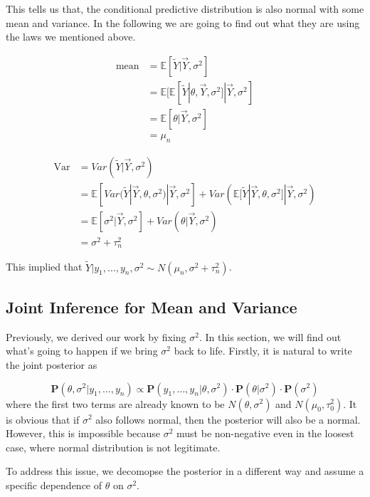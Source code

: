This tells us that, the conditional predictive distribution is also normal with some mean and variance. In the following we are going to find out what they are using the laws we mentioned above. 

\begin{align*}
    \text{mean} &= \mathbb{E}[\tilde{Y} | \vec{Y}, \sigma^2] \\
    &=\mathbb{E}[\mathbb{E}[\tilde{Y} | \theta, \vec{Y}, \sigma^2] | \vec{Y}, \sigma^2] \\
    &=\mathbb{E}[\theta | \vec{Y}, \sigma^2] \\
    &=\mu_n
\end{align*}

\begin{align*}
    \text{Var} &= Var(\tilde{Y} | \vec{Y}, \sigma^2) \\
    &= \mathbb{E}[ Var(\tilde{Y} | \vec{Y}, \theta, \sigma^2) | \vec{Y}, \sigma^2] + Var(\mathbb{E}[\tilde{Y} | \vec{Y}, \theta, \sigma^2] | \vec{Y}, \sigma^2) \\
    &= \mathbb{E}[\sigma^2 | \vec{Y}, \sigma^2] + Var(\theta | \vec{Y}, \sigma^2) \\
    &= \sigma^2 + \tau_n^2
\end{align*}

This implied that $\tilde{Y} | y_1, \ldots, y_n, \sigma^2 \sim N(\mu_n, \sigma^2 + \tau_n^2)$.

\subsection{Joint Inference for Mean and Variance}
Previously, we derived our work by fixing $\sigma^2$. In this section, we will find out what's going to happen if we bring $\sigma^2$ back to life. Firstly, it is natural to write the joint posterior as

\begin{equation*}
    \mathbf{P}(\theta, \sigma^2 | y_1, \ldots, y_n) \propto \mathbf{P}(y_1, \ldots, y_n | \theta, \sigma^2) \cdot \mathbf{P}(\theta | \sigma^2) \cdot \mathbf{P}(\sigma^2)
\end{equation*}
where the first two terms are already known to be $N(\theta, \sigma^2)$ and $N(\mu_0, \tau_0^2)$. It is obvious that if $\sigma^2$ also follows normal, then the posterior will also be a normal. However, this is impossible because $\sigma^2$ must be non-negative even in the loosest case, where normal distribution is not legitimate.  

To address this issue, we decomopse the posterior in a different way and assume a specific dependence of $\theta$ on $\sigma^2$.

